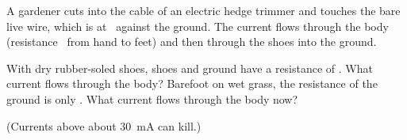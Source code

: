 A gardener cuts into the cable of an electric hedge trimmer and touches the bare live wire, which is at \VO\ against the ground. The current flows through the body (resistance \RbO\ from hand to feet) and then through the shoes into the ground.

\begin{abcliste}
\abc With dry rubber-soled shoes, shoes and ground have a resistance of \RsO. What current flows through the body?
\abc Barefoot on wet grass, the resistance of the ground is only \RwO. What current flows through the body now?
\end{abcliste}

(Currents above about \SI{30}{\milli\ampere} can kill.)
